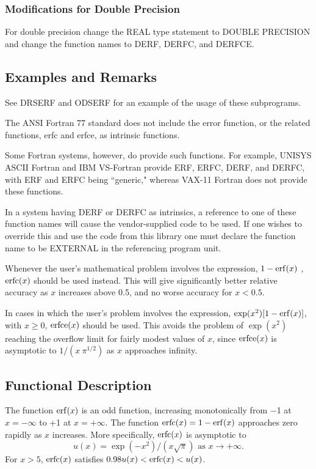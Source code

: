 \documentclass[twoside]{MATH77}
\begin{document}
\subsubsection{Modifications for Double Precision}

For double precision change the REAL type statement to DOUBLE PRECISION and
change the function names to DERF, DERFC, and DERFCE.

\subsection{Examples and Remarks}

See DRSERF and ODSERF for an example of the usage of these subprograms.

The ANSI Fortran 77 standard does not include the error function, or the
related functions, erfc and erfce, as intrinsic functions.

Some Fortran systems, however, do provide such functions. For example,
UNISYS ASCII Fortran and IBM VS-Fortran provide ERF, ERFC, DERF, and DERFC,
with ERF and ERFC being ``generic," whereas VAX-11 Fortran does not provide
these functions.

In a system having DERF or DERFC as intrinsics, a reference to one of these
function names will cause the vendor-supplied code to be used. If one wishes
to override this and use the code from this library one must declare the
function name to be EXTERNAL in the referencing program unit.

Whenever the user's mathematical problem involves the expression, $1-\erf (x)$%
, $\erfc (x)$ should be used instead. This will give significantly better
relative accuracy as $x$ increases above 0.5, and no worse accuracy for $x <
0.5.$

In cases in which the user's problem involves the expression, $\exp (x^2)
[1-\erf (x)]$, with $x \geq 0$, $\erfce (x)$ should be used. This avoids the
problem of $\exp (x^2)$ reaching the overflow limit for fairly modest values
of $x$, since $\erfce (x)$ is asymptotic to $1/(x\ \pi ^{1/2})$ as $x$
approaches infinity.

\subsection{Functional Description}

The function $\erf (x)$ is an odd function, increasing monotonically from $-$1
at $x = -\infty $ to +1 at $x = +\infty .$
The function $\erfc (x) = 1 - \erf (x)$ approaches zero rapidly as $x$
increases. More specifically, $\erfc (x)$ is asymptotic to
\begin{equation*}
u(x) =  \exp (-x^2) / (x \sqrt \pi) \text{ as }x \rightarrow + \infty .
\end{equation*}
For $x > 5$, $\erfc (x)$ satisfies $0.98 u(x) < \erfc (x) < u(x)$.
\vspace{10pt}
\end{document}
